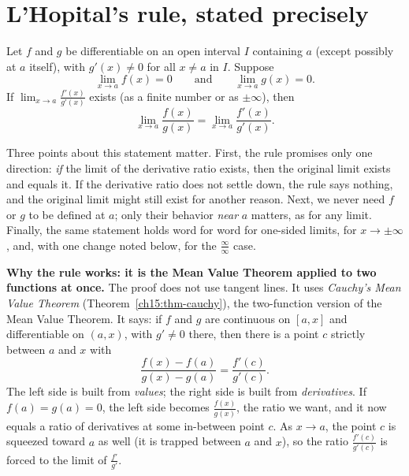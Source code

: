 \section{L'Hopital's rule, stated precisely}

\begin{theorem}\label{ch18:thm-lhopital}
Let $f$ and $g$ be differentiable on an open interval $I$ containing $a$ (except possibly
at $a$ itself), with $g'(x)\neq 0$ for all $x\neq a$ in $I$. Suppose
\[
\lim_{x\to a}f(x)=0\qquad\text{and}\qquad \lim_{x\to a}g(x)=0.
\]
If $\displaystyle\lim_{x\to a}\frac{f'(x)}{g'(x)}$ exists (as a finite number or as
$\pm\infty$), then
\[
\lim_{x\to a}\frac{f(x)}{g(x)}=\lim_{x\to a}\frac{f'(x)}{g'(x)}.
\]
\end{theorem}

Three points about this statement matter.
First, the rule promises only one direction: \emph{if} the limit of the derivative ratio
exists, then the original limit exists and equals it. If the
derivative ratio does not settle down, the rule says nothing, and
the original limit might still exist for another reason. Next, we never need
$f$ or $g$ to be defined at $a$; only their behavior \emph{near} $a$ matters, as
for any limit. Finally, the same statement holds word for word for one-sided
limits, for $x\to\pm\infty$, and, with one change noted below, for the
$\tfrac{\infty}{\infty}$ case.

\begin{whybox}
\textbf{Why the rule works: it is the Mean Value Theorem applied to two functions at
once.} The proof does not use tangent lines. It uses
\emph{Cauchy's Mean Value Theorem} (Theorem~\ref{ch15:thm-cauchy}), the two-function
version of the Mean Value Theorem. It says: if $f$ and $g$ are continuous on
$[a,x]$ and differentiable on $(a,x)$, with $g'\neq 0$ there, then there is a point $c$
strictly between $a$ and $x$ with
\[
\frac{f(x)-f(a)}{g(x)-g(a)}=\frac{f'(c)}{g'(c)}.
\]
The left side is built from \emph{values}; the right side is built
from \emph{derivatives}. If $f(a)=g(a)=0$, the left side becomes
$\tfrac{f(x)}{g(x)}$, the ratio we want, and it now equals a ratio of
derivatives at some in-between point $c$. As $x\to a$, the point $c$ is squeezed
toward $a$ as well (it is trapped between $a$ and $x$), so the ratio
$\tfrac{f'(c)}{g'(c)}$ is forced to the limit of $\tfrac{f'}{g'}$.
\end{whybox}

